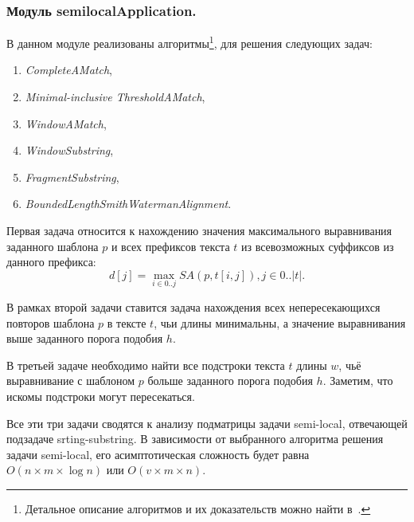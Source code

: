 \subsubsection{Модуль semilocalApplication.}
В данном модуле реализованы алгоритмы\footnote{Детальное описание алгоритмов и их доказательств можно найти в~\cite{tiskin2006all}.}, для решения следующих задач:
\begin{enumerate}
    \item \emph{CompleteAMatch},
    \item \emph{Minimal-inclusive ThresholdAMatch},
    \item \emph{WindowAMatch},
    \item \emph{WindowSubstring},
    \item \emph{FragmentSubstring},
    \item \emph{BoundedLengthSmithWatermanAlignment}.
\end{enumerate}

Первая задача относится к нахождению значения максимального выравнивания заданного шаблона $p$ и всех префиксов текста $t$ из всевозможных суффиксов из данного префикса:
\begin{equation}
    d[j] = \max _{i \in 0 ..j} SA(p,t[i,j]), j \in 0..|t|.
\end{equation}

В рамках второй задачи ставится задача нахождения всех непересекающихся повторов шаблона $p$ в тексте $t$, чьи длины минимальны, а значение выравнивания выше заданного порога подобия $h$.

В третьей задаче необходимо найти все подстроки текста $t$ длины $w$, чьё выравнивание с шаблоном $p$ больше заданного порога подобия $h$. Заметим, что искомы подстроки могут пересекаться.

Все эти три задачи сводятся к анализу подматрицы задачи semi-local, отвечающей подзадаче srting-substring.
В зависимости от выбранного алгоритма решения задачи semi-local, его асимптотическая сложность будет равна $O(n \times m \times \log n)$ или $O(v \times  m \times n)$.

